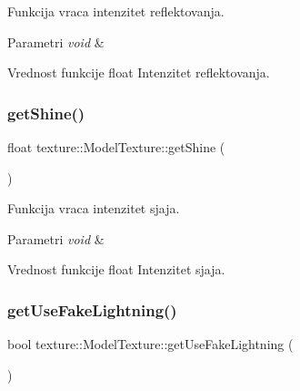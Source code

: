 Funkcija vraca intenzitet reflektovanja. 


\begin{DoxyParams}{Parametri}
{\em void} & \\
\hline
\end{DoxyParams}
\begin{DoxyReturn}{Vrednost funkcije}
float Intenzitet reflektovanja. 
\end{DoxyReturn}
\mbox{\label{classtexture_1_1Texture_a2336ba8c1ccc1eea9419fb2cd3773888}} 
\subsubsection{\texorpdfstring{get\+Shine()}{getShine()}}
{\footnotesize\ttfamily float texture\+::\+Model\+Texture\+::get\+Shine (\begin{DoxyParamCaption}{ }\end{DoxyParamCaption})}



Funkcija vraca intenzitet sjaja. 


\begin{DoxyParams}{Parametri}
{\em void} & \\
\hline
\end{DoxyParams}
\begin{DoxyReturn}{Vrednost funkcije}
float Intenzitet sjaja. 
\end{DoxyReturn}
\mbox{\label{classtexture_1_1Texture_adc202fd47232d085312fea26bc17d69e}} 
\subsubsection{\texorpdfstring{get\+Use\+Fake\+Lightning()}{getUseFakeLightning()}}
{\footnotesize\ttfamily bool texture\+::\+Model\+Texture\+::get\+Use\+Fake\+Lightning (\begin{DoxyParamCaption}{ }\end{DoxyParamCaption})}



